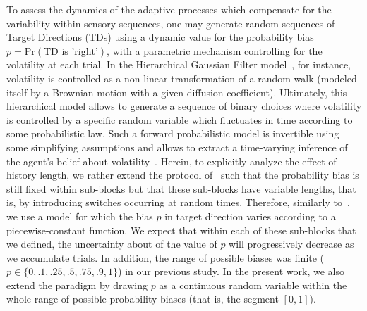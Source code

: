 \documentclass[10pt,letterpaper]{article}
\newcommand{\citep}[1]{\cite{#1}}
\newcommand{\citet}[1]{\cite{#1}}
\newcommand{\Rone}[1]{\textbf{\textcolor{magenta}{[rev 1: #1]}}}
\begin{document}
To assess the dynamics of the adaptive processes
which compensate for the variability within sensory sequences,
one may generate random sequences of Target Directions (TDs)
using a dynamic value for the probability bias $p = \text{Pr}(\text{TD is 'right'})$,
with a parametric mechanism controlling for the volatility at each trial.
In the Hierarchical Gaussian Filter model~\citep{Mathys11}, for instance,
volatility is controlled as a non-linear transformation
of a random walk (modeled itself by a Brownian motion with a given diffusion coefficient).
Ultimately, this hierarchical model allows to generate a sequence of binary choices
where volatility is controlled by %
a specific random variable which fluctuates in time according to some probabilistic law.
Such a forward probabilistic model is invertible
using some simplifying assumptions and allows
to extract a time-varying inference of the agent's belief about volatility~\citep{Vossel14}.
Herein, to explicitly analyze the effect of history length,
we rather extend the protocol of~\citet{Montagnini2010} such that the probability bias
is still fixed within sub-blocks but that these sub-blocks have variable lengths,
that is, by introducing switches occurring at random times.
Therefore, similarly to~\citet{Meyniel13}, we use a model for which
the bias $p$ in target direction varies according to a piecewise-constant function.
We expect that within each of these sub-blocks that we defined,
the uncertainty about of the value of $p$
will progressively decrease as we accumulate trials.
In addition, the range of possible biases was finite ($p \in \{0, .1, .25, .5, .75, .9, 1\}$) in our previous study.
In the present work, we also extend the paradigm
by drawing $p$ as a continuous random variable
within the whole range of possible probability biases (that is, the segment $[ 0, 1 ]$).
\end{document}
